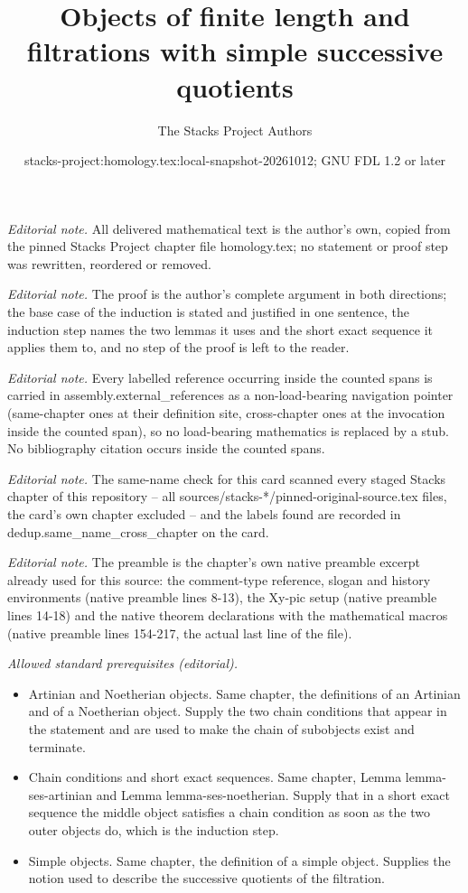 \documentclass[10pt,a4paper]{amsart}
\title{Objects of finite length and filtrations with simple successive quotients}
\author{The Stacks Project Authors}
\date{stacks-project:homology.tex:local-snapshot-20261012; GNU FDL 1.2 or later}
\theoremstyle{plain}
\theoremstyle{definition}
\theoremstyle{remark}
\numberwithin{equation}{subsection}
\begin{document}
\maketitle
\noindent\textit{Editorial note.} All delivered mathematical text is the author's own, copied from the pinned Stacks Project chapter file homology.tex; no statement or proof step was rewritten, reordered or removed.\par\medskip
\noindent\textit{Editorial note.} The proof is the author's complete argument in both directions; the base case of the induction is stated and justified in one sentence, the induction step names the two lemmas it uses and the short exact sequence it applies them to, and no step of the proof is left to the reader.\par\medskip
\noindent\textit{Editorial note.} Every labelled reference occurring inside the counted spans is carried in assembly.external\_references as a non-load-bearing navigation pointer (same-chapter ones at their definition site, cross-chapter ones at the invocation inside the counted span), so no load-bearing mathematics is replaced by a stub. No bibliography citation occurs inside the counted spans.\par\medskip
\noindent\textit{Editorial note.} The same-name check for this card scanned every staged Stacks chapter of this repository -- all sources/stacks-*/pinned-original-source.tex files, the card's own chapter excluded -- and the labels found are recorded in dedup.same\_name\_cross\_chapter on the card.\par\medskip
\noindent\textit{Editorial note.} The preamble is the chapter's own native preamble excerpt already used for this source: the comment-type reference, slogan and history environments (native preamble lines 8-13), the Xy-pic setup (native preamble lines 14-18) and the native theorem declarations with the mathematical macros (native preamble lines 154-217, the actual last line of the file).\par\medskip
\noindent\textit{Allowed standard prerequisites (editorial).}\begin{itemize}
\item Artinian and Noetherian objects. Same chapter, the definitions of an Artinian and of a Noetherian object. Supply the two chain conditions that appear in the statement and are used to make the chain of subobjects exist and terminate.
\item Chain conditions and short exact sequences. Same chapter, Lemma lemma-ses-artinian and Lemma lemma-ses-noetherian. Supply that in a short exact sequence the middle object satisfies a chain condition as soon as the two outer objects do, which is the induction step.
\item Simple objects. Same chapter, the definition of a simple object. Supplies the notion used to describe the successive quotients of the filtration.
\end{itemize}\medskip
\end{document}
